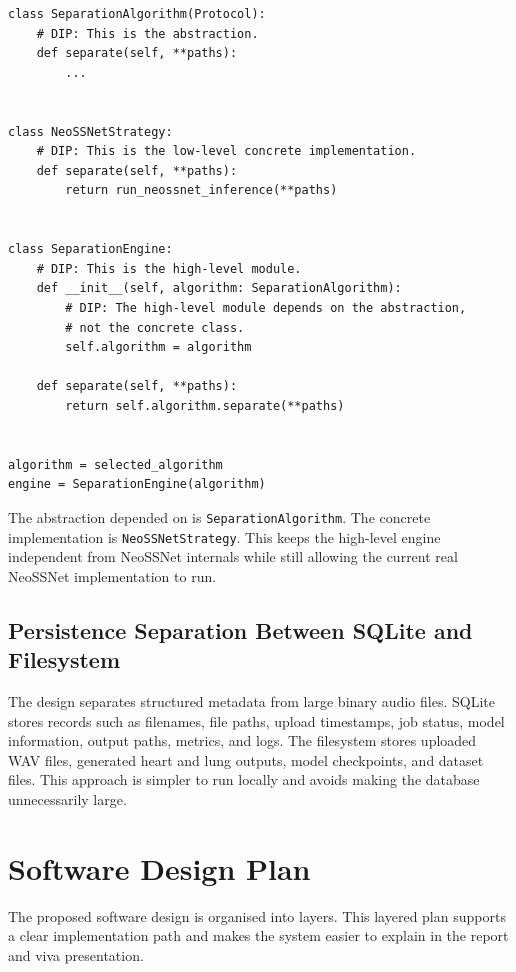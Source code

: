 \begin{lstlisting}[caption={DIP Example: Engine Depends on the Abstraction}]
class SeparationAlgorithm(Protocol):
    # DIP: This is the abstraction.
    def separate(self, **paths):
        ...


class NeoSSNetStrategy:
    # DIP: This is the low-level concrete implementation.
    def separate(self, **paths):
        return run_neossnet_inference(**paths)


class SeparationEngine:
    # DIP: This is the high-level module.
    def __init__(self, algorithm: SeparationAlgorithm):
        # DIP: The high-level module depends on the abstraction,
        # not the concrete class.
        self.algorithm = algorithm

    def separate(self, **paths):
        return self.algorithm.separate(**paths)


algorithm = selected_algorithm
engine = SeparationEngine(algorithm)
\end{lstlisting}

The abstraction depended on is \texttt{SeparationAlgorithm}. The concrete implementation is \texttt{NeoSSNetStrategy}. This keeps the high-level engine independent from NeoSSNet internals while still allowing the current real NeoSSNet implementation to run.

\subsection{Persistence Separation Between SQLite and Filesystem}

The design separates structured metadata from large binary audio files. SQLite stores records such as filenames, file paths, upload timestamps, job status, model information, output paths, metrics, and logs. The filesystem stores uploaded WAV files, generated heart and lung outputs, model checkpoints, and dataset files. This approach is simpler to run locally and avoids making the database unnecessarily large.

\section{Software Design Plan}

The proposed software design is organised into layers. This layered plan supports a clear implementation path and makes the system easier to explain in the report and viva presentation.

